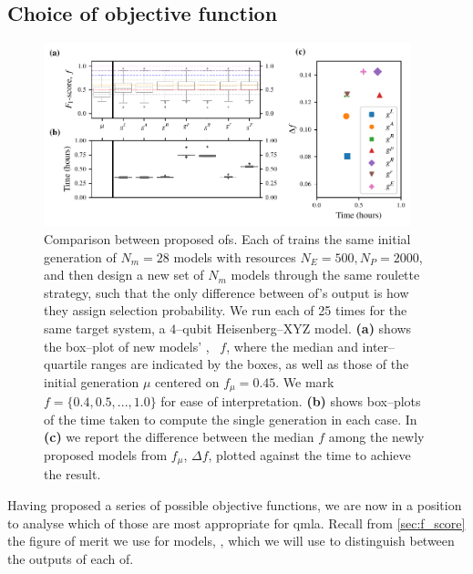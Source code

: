 \subsection{Choice of objective function}\label{sec:obj_fnc_selection}
\begin{figure}
    \centering
    \includegraphics[width=0.95\textwidth]{theoretical_study/figures/objective_fnc_comparison.pdf}
    \caption[Comparison between proposed \glspl{of}.]{
        Comparison between proposed \glspl{of}. 
        Each \gls{of} trains the same initial generation of $N_m=28$ models with resources
        $N_E=500, N_P=2000$, and then design a new set of $N_m$ models through 
        the same roulette strategy, such that the only difference between \gls{of}'s output 
        is how they assign selection probability.
        We run each \gls{of} 25 times for the same target system, 
            a $4$--qubit Heisenberg--XYZ model. 
        \textbf{(a)} shows the box--plot of new models' \fs, \ $f$, 
            where the median and inter--quartile ranges are indicated by the boxes,
            as well as those of the initial generation $\mu$ centered on $f_{\mu}=0.45$.
            We mark $f=\{0.4, 0.5, ..., 1.0\}$ for ease of interpretation. 
        \textbf{(b)} shows box--plots of the time taken to compute the single generation in each case.
        In \textbf{(c)} we report the difference between the median $f$ among the 
            newly proposed models from $f_{\mu}$, $\Delta f$,
            plotted against the time to achieve the result. 
    }
    \label{fig:obj_fnc_comparison}
\end{figure}

Having proposed a series of possible objective functions, 
    we are now in a position to analyse which of those are most appropriate for \gls{qmla}. 
Recall from \cref{sec:f_score} the figure of merit we use for models, \fs, 
    which we will use to distinguish between the outputs of each \gls{of}.
\par 

